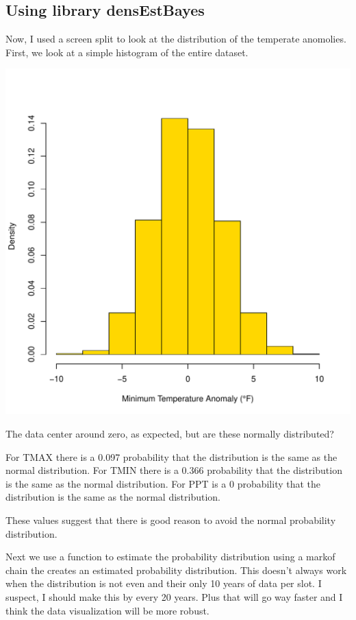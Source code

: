 \documentclass{article}\usepackage[]{graphicx}\usepackage[]{color}
\makeatletter
\def\maxwidth{ %
  \ifdim\Gin@nat@width>\linewidth
    \linewidth
  \else
    \Gin@nat@width
  \fi
}
\newenvironment{knitrout}{}{} %
\makeatother
\begin{document}
\subsection{Using library densEstBayes}

Now, I used a screen split to look at the distribution of the temperate anomolies. First, we look at a simple histogram of the entire dataset. 

\begin{knitrout}
\color{fgcolor}
\includegraphics[width=\maxwidth]{figure/unnamed-chunk-16-1} 
\end{knitrout}

The data center around zero, as expected, but are these normally distributed? 

For TMAX there is a 0.097 probability that the distribution is the same as the normal distribution. For TMIN there is a 0.366 probability that the distribution is the same as the normal distribution. For PPT is a 0 probability that the distribution is the same as the normal distribution.



These values suggest that there is good reason to avoid  the normal probability distribution. 

Next we use a function to estimate the probability distribution using a markof chain the creates an estimated probability distribution. This doesn't always work when the distribution is not even and their only 10 years of data per slot. I suspect, I should make this by every 20 years. Plus that will go way faster and I think the data visualization will be more robust. 
\end{document}
